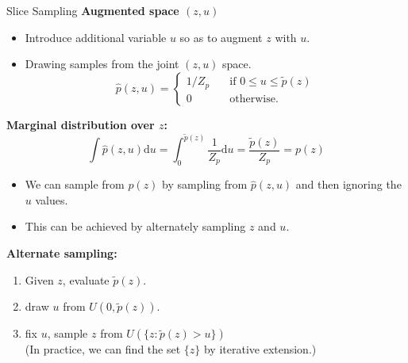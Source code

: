 \documentclass{bredelebeamer}
\begin{document}
\begin{frame}{Slice Sampling}
  \textbf{Augmented space $(z,u)$}
  \begin{itemize}
    \item Introduce additional variable $u$ so as to augment $z$ with $u$.
    \item Drawing samples from the joint $(z, u)$ space.
    \begin{equation}
      \hat{p}(z, u) =
      \left\{
      \begin{array}{ll}
        1/Z_p \quad & \textrm{if $0 \leq u \leq \tilde{p}(z)$} \\
        0     \quad & \textrm{otherwise.}
      \end{array}
      \right.
    \end{equation}
  \end{itemize}

  \textbf{Marginal distribution over $z$:}
  \begin{equation}
    \int \hat{p}(z, u) \mathrm{d}u
    = \int_{0}^{\tilde{p}(z)} \frac{1}{Z_p} \mathrm{d}u
    = \frac{\tilde{p}(z)}{Z_p} = p(z)
  \end{equation}
  \begin{itemize}
    \item We can sample from $p(z)$ by sampling from $\hat{p}(z, u)$ and
    then ignoring the $u$ values.
    \item This can be achieved by alternately sampling $z$ and $u$.
  \end{itemize}

  \textbf{Alternate sampling:}
  \begin{enumerate}
    \item Given $z$, evaluate $\tilde{p}(z)$.
    \item draw $u$ from $U(0, \tilde{p}(z))$.
    \item fix $u$, sample $z$ from $U(\{ z : \tilde{p}(z) > u \})$ \\
    (In practice, we can find the set $\{ z \}$ by iterative extension.)
  \end{enumerate}
\end{frame}
\end{document}
